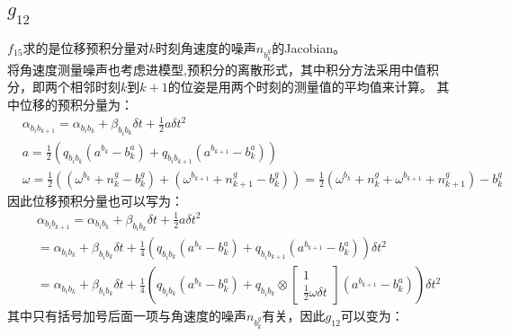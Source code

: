 \documentclass[UTF8]{ctexart}
\begin{document}
\subsection{${g_{12}}$}
\indent $f_{15}$求的是位移预积分量对$k$时刻角速度的噪声$n_{b_k^g}$的Jacobian。\\
\indent 将角速度测量噪声也考虑进模型,预积分的离散形式，其中积分方法采用中值积分，即两个相邻时刻$k$到$k+1$的位姿是用两个时刻的测量值的平均值来计算。
其中位移的预积分量为：\\
\begin{equation}
\begin{aligned}
&\alpha_{b_ib_{k+1}}=\alpha_{b_ib_k}+\beta_{b_ib_k}\delta t+\frac{1}{2}a \delta t^2\\
&a=\frac{1}{2}(q_{b_ib_k}(a^{b_k}-b_k^a)+q_{b_ib_{k+1}}(a^{b_{k+1}}-b_k^a))\\
&\omega=\frac{1}{2}((\omega^{b_k}+n_k^g-b_k^g)+(\omega^{b_{k+1}}+n_{k+1}^g-b_k^g))=\frac{1}{2}(\omega^{b_k}+n_k^g+\omega^{b_{k+1}}+n_{k+1}^g)-b_k^g
\end{aligned}
\end{equation}
\indent 因此位移预积分量也可以写为：\\
\begin{equation}
\begin{aligned}
&\alpha_{b_ib_{k+1}}=\alpha_{b_ib_k}+\beta_{b_ib_k}\delta t+\frac{1}{2}a \delta t^2\\
&=\alpha_{b_ib_k}+\beta_{b_ib_k}\delta t+\frac{1}{4}(q_{b_ib_k}(a^{b_k}-b_k^a)+q_{b_ib_{k+1}}(a^{b_{k+1}}-b_k^a))\delta t^2\\
&=\alpha_{b_ib_k}+\beta_{b_ib_k}\delta t+\frac{1}{4}(q_{b_ib_k}(a^{b_k}-b_k^a)+q_{b_ib_k}\otimes
\left[\begin{array}{cccc} 
1 \\
\frac{1}{2}\omega\delta t
\end{array}\right] (a^{b_{k+1}}-b_k^a))\delta t^2
\end{aligned}
\end{equation}
\indent 其中只有括号加号后面一项与角速度的噪声$n_{b_k^g}$有关，因此$g_{12}$可以变为：\\
\end{document}
